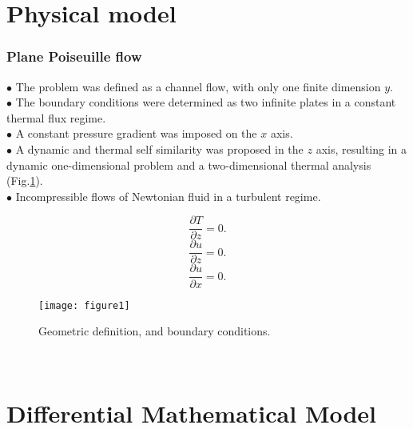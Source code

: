 \documentclass[xcolor=dvipsnames,8pt,aspectratio=34]{beamer}
\begin{document}
	\section{Physical model}
	
	
	
	
	
		\begin{frame}
			\frametitle{Plane Poiseuille flow}
			$\bullet$ The problem was defined as a channel flow, with only one finite dimension $y$. \\
			$\bullet$ The boundary conditions were determined as two infinite plates in a constant thermal flux regime.\\
			$\bullet$ A constant pressure gradient was imposed on the $x$ axis.\\
			$\bullet$ A dynamic and thermal self similarity was proposed in the $z$ axis, resulting in a dynamic one-dimensional problem and a two-dimensional thermal analysis (Fig.\ref{figure.1}). \\
			$\bullet$ Incompressible flows of Newtonian fluid in a turbulent regime.\\
			\begin{minipage}[h!]{0.3\textwidth}
				\begin{equation*}
				 \frac{\partial T }{\partial z} = 0.
				\end{equation*}
				\begin{equation*}
				\frac{\partial u }{\partial z} = 0.
				\end{equation*}
				\begin{equation*}
				\frac{\partial u }{\partial x} = 0.
				\end{equation*}
			\end{minipage}
			\begin{minipage}[h!]{0.5\textwidth}
			\begin{figure}[h!]
				\centering
				\texttt{[image: figure1]}
				\caption{Geometric definition, and boundary conditions.}
				\label{figure.1}
			\end{figure}
			\end{minipage}
			\\
		\end{frame}
	
	

	
	\section{Differential Mathematical Model}
	
\end{document}
